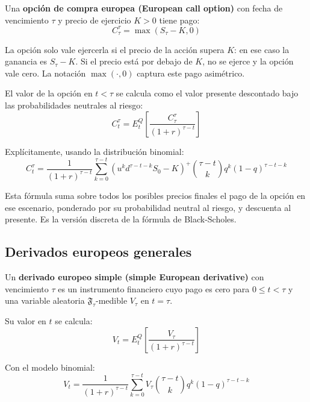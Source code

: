 \documentclass[12pt]{article}
\begin{document}
Una \textbf{opci\'on de compra europea (European call option)} con fecha de vencimiento $\tau$ y precio de ejercicio $K > 0$ tiene pago:
\begin{equation}
    C_\tau^\tau = \max(S_\tau - K, 0)
\end{equation}

\begin{intuicionmat}
La opci\'on solo vale ejercerla si el precio de la acci\'on supera $K$: en ese caso la ganancia es $S_\tau - K$. Si el precio est\'a por debajo de $K$, no se ejerce y la opci\'on vale cero. La notaci\'on $\max(\cdot, 0)$ captura este pago asim\'etrico.
\end{intuicionmat}

El valor de la opci\'on en $t < \tau$ se calcula como el valor presente descontado bajo las probabilidades neutrales al riesgo:
\begin{equation}
    C_t^\tau = E_t^Q\left[\frac{C_\tau^\tau}{(1+r)^{\tau-t}}\right]
\end{equation}

Expl\'icitamente, usando la distribuci\'on binomial:
\begin{equation}
    C_t^\tau = \frac{1}{(1+r)^{\tau-t}} \sum_{k=0}^{\tau-t} (u^k d^{\tau-t-k} S_0 - K)^+ \binom{\tau-t}{k} q^k (1-q)^{\tau-t-k}
\end{equation}

\begin{intuicionmat}
Esta f\'ormula suma sobre todos los posibles precios finales el pago de la opci\'on en ese escenario, ponderado por su probabilidad neutral al riesgo, y descuenta al presente. Es la versi\'on discreta de la f\'ormula de Black-Scholes.
\end{intuicionmat}

\subsection{Derivados europeos generales}

Un \textbf{derivado europeo simple (simple European derivative)} con vencimiento $\tau$ es un instrumento financiero cuyo pago es cero para $0 \leq t < \tau$ y una variable aleatoria $\mathfrak{F}_\tau$-medible $V_\tau$ en $t = \tau$.

Su valor en $t$ se calcula:
\begin{equation}
    V_t = E_t^Q\left[\frac{V_\tau}{(1+r)^{\tau-t}}\right]
\end{equation}

Con el modelo binomial:
\begin{equation}
    V_t = \frac{1}{(1+r)^{\tau-t}} \sum_{k=0}^{\tau-t} V_\tau \binom{\tau-t}{k} q^k (1-q)^{\tau-t-k}
\end{equation}
\end{document}
